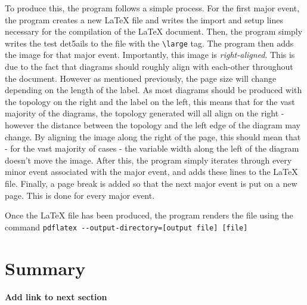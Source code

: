 To produce this, the program follows a simple process.
For the first major event, the program creates a new LaTeX file and writes the import and setup lines necessary for the compilation of the LaTeX document.
Then, the program simply writes the test det5ails to the file with the \verb|\large| tag.
The program then adds the image for that major event. Importantly, this image is \emph{right-aligned}. 
This is due to the fact that diagrams should roughly align with each-other throughout the document.
However as mentioned previously, the page size will change depending on the length of the label.
As most diagrams should be produced with the topology on the right and the label on the left, this means that for the vast majority of the diagrams, the topology generated will all align on the right - however the distance between the topology and the left edge of the diagram may change.
By aligning the image along the right of the page, this should mean that - for the vast majority of cases - the variable width along the left of the diagram doesn't move the image.
After this, the program simply iterates through every minor event associated with the major event, and adds these lines to the LaTeX file.
Finally, a page break is added so that the next major event is put on a new page.
This is done for every major event.

Once the LaTeX file has been produced, the program renders the file using the command
\verb|pdflatex --output-directory=[output file] [file]|


\section{Summary}
\textbf{Add link to next section}
